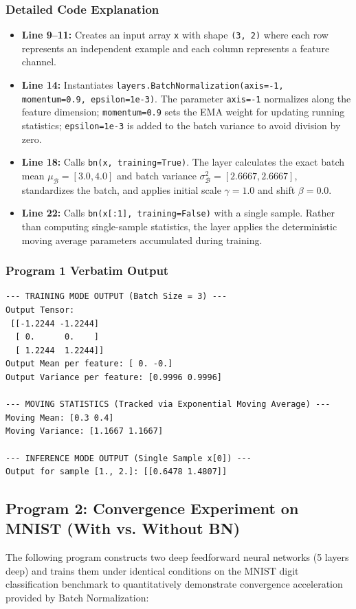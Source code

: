 \documentclass[12pt,a4paper]{article}
\begin{document}
\subsubsection*{Detailed Code Explanation}
\begin{itemize}[leftmargin=*]
    \item \textbf{Line 9--11:} Creates an input array \texttt{x} with shape \texttt{(3, 2)} where each row represents an independent example and each column represents a feature channel.
    \item \textbf{Line 14:} Instantiates \texttt{layers.BatchNormalization(axis=-1, momentum=0.9, epsilon=1e-3)}. The parameter \texttt{axis=-1} normalizes along the feature dimension; \texttt{momentum=0.9} sets the EMA weight for updating running statistics; \texttt{epsilon=1e-3} is added to the batch variance to avoid division by zero.
    \item \textbf{Line 18:} Calls \texttt{bn(x, training=True)}. The layer calculates the exact batch mean $\mu_{\mathcal{B}} = [3.0, 4.0]$ and batch variance $\sigma_{\mathcal{B}}^2 = [2.6667, 2.6667]$, standardizes the batch, and applies initial scale $\gamma = 1.0$ and shift $\beta = 0.0$.
    \item \textbf{Line 22:} Calls \texttt{bn(x[:1], training=False)} with a single sample. Rather than computing single-sample statistics, the layer applies the deterministic moving average parameters accumulated during training.
\end{itemize}

\subsubsection*{Program 1 Verbatim Output}
\begin{verbatim}
--- TRAINING MODE OUTPUT (Batch Size = 3) ---
Output Tensor:
 [[-1.2244 -1.2244]
  [ 0.      0.    ]
  [ 1.2244  1.2244]]
Output Mean per feature: [ 0. -0.]
Output Variance per feature: [0.9996 0.9996]

--- MOVING STATISTICS (Tracked via Exponential Moving Average) ---
Moving Mean: [0.3 0.4]
Moving Variance: [1.1667 1.1667]

--- INFERENCE MODE OUTPUT (Single Sample x[0]) ---
Output for sample [1., 2.]: [[0.6478 1.4807]]
\end{verbatim}

\subsection{Program 2: Convergence Experiment on MNIST (With vs. Without BN)}
The following program constructs two deep feedforward neural networks (5 layers deep) and trains them under identical conditions on the MNIST digit classification benchmark to quantitatively demonstrate convergence acceleration provided by Batch Normalization:
\end{document}
